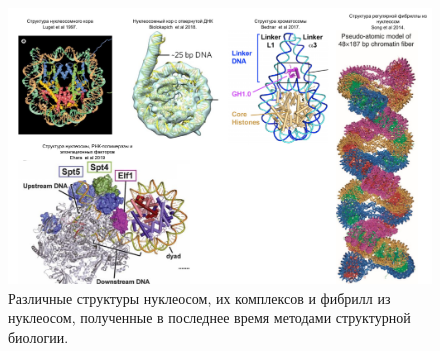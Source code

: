 \begin{figure} [H]
    \centering
    \includegraphics[width=\textwidth]{images/p6/p6_1_vved/p6_1_f4.pdf}
    \caption{Различные структуры нуклеосом, их комплексов и фибрилл из нуклеосом, полученные в последнее время методами структурной биологии.}
    \label{fig:p6_1_f4}
\end{figure}
    
    
    
    
    
    
    
    
    
    
    
    
    
    
    
    
    
    
    
    
    
    
    
    
    
    
    
    
    
    
    
    
    
    
    
    
    
    
    
    
    
    
    
    
    
    
    
    
    
    
    
    
    
    
    
    
    
    
    
    
    
    
    
    
    
    
    
    
    
    